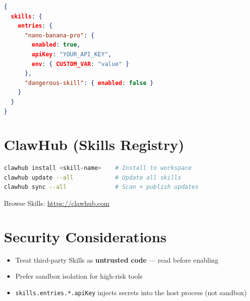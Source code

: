 \begin{lstlisting}[language=json]
{
  skills: {
    entries: {
      "nano-banana-pro": {
        enabled: true,
        apiKey: "YOUR_API_KEY",
        env: { CUSTOM_VAR: "value" }
      },
      "dangerous-skill": { enabled: false }
    }
  }
}
\end{lstlisting}

\section{ClawHub (Skills Registry)}

\begin{lstlisting}[language=bash]
clawhub install <skill-name>    # Install to workspace
clawhub update --all            # Update all skills
clawhub sync --all              # Scan + publish updates
\end{lstlisting}

Browse Skills: \href{https://clawhub.com}{https://clawhub.com}

\section{Security Considerations}

\begin{itemize}
  \item Treat third-party Skills as \textbf{untrusted code} --- read before enabling
  \item Prefer sandbox isolation for high-risk tools
  \item \texttt{skills.entries.*.apiKey} injects secrets into the host process (not sandbox)
\end{itemize}
